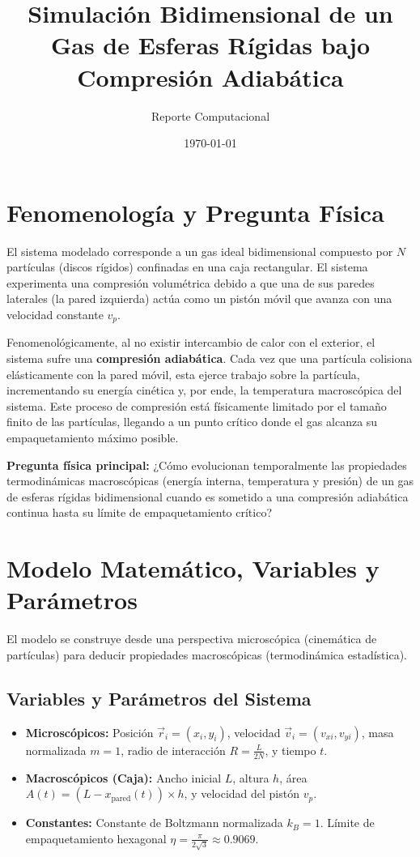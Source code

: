 \documentclass[12pt,a4paper]{article}
\title{\textbf{Simulación Bidimensional de un Gas de Esferas Rígidas bajo Compresión Adiabática}}
\author{Reporte Computacional}
\date{\today}
\begin{document}
\maketitle

\section{Fenomenología y Pregunta Física}
El sistema modelado corresponde a un gas ideal bidimensional compuesto por $N$ partículas (discos rígidos) confinadas en una caja rectangular. El sistema experimenta una compresión volumétrica debido a que una de sus paredes laterales (la pared izquierda) actúa como un pistón móvil que avanza con una velocidad constante $v_p$. 

Fenomenológicamente, al no existir intercambio de calor con el exterior, el sistema sufre una \textbf{compresión adiabática}. Cada vez que una partícula colisiona elásticamente con la pared móvil, esta ejerce trabajo sobre la partícula, incrementando su energía cinética y, por ende, la temperatura macroscópica del sistema. Este proceso de compresión está físicamente limitado por el tamaño finito de las partículas, llegando a un punto crítico donde el gas alcanza su empaquetamiento máximo posible.

\textbf{Pregunta física principal:} ¿Cómo evolucionan temporalmente las propiedades termodinámicas macroscópicas (energía interna, temperatura y presión) de un gas de esferas rígidas bidimensional cuando es sometido a una compresión adiabática continua hasta su límite de empaquetamiento crítico?

\section{Modelo Matemático, Variables y Parámetros}
El modelo se construye desde una perspectiva microscópica (cinemática de partículas) para deducir propiedades macroscópicas (termodinámica estadística).

\subsection*{Variables y Parámetros del Sistema}
\begin{itemize}
    \item \textbf{Microscópicos:} Posición $\vec{r}_i = (x_i, y_i)$, velocidad $\vec{v}_i = (v_{xi}, v_{yi})$, masa normalizada $m=1$, radio de interacción $R = \frac{L}{2N}$, y tiempo $t$.
    \item \textbf{Macroscópicos (Caja):} Ancho inicial $L$, altura $h$, área $A(t) = (L - x_{\text{pared}}(t)) \times h$, y velocidad del pistón $v_p$.
    \item \textbf{Constantes:} Constante de Boltzmann normalizada $k_B = 1$. Límite de empaquetamiento hexagonal $\eta = \frac{\pi}{2\sqrt{3}} \approx 0.9069$.
\end{itemize}
\end{document}
